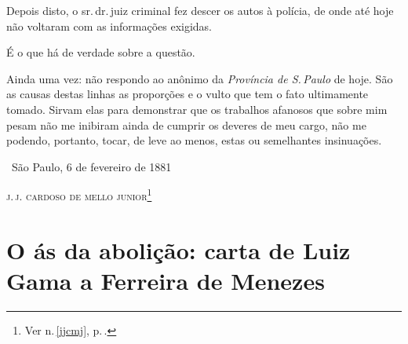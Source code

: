 Depois disto, o sr.\,dr.\,juiz criminal fez descer os autos à polícia, de
onde até hoje não voltaram com as informações exigidas.

É o que há de verdade sobre a questão.

Ainda uma vez: não respondo ao anônimo da \emph{Província de S.\,Paulo}
de hoje. São as causas destas linhas as proporções e o vulto
que tem o fato ultimamente tomado. Sirvam elas para demonstrar que os
trabalhos afanosos que sobre mim pesam não me inibiram ainda de cumprir
os deveres de meu cargo, não me podendo, portanto, tocar, de leve ao
menos, estas ou semelhantes insinuações.

\medskip
\hfill\ São Paulo, 6 de fevereiro de 1881

\hfill\textsc{j.\,j. cardoso de mello junior}\footnote{Ver n.\,\ref{jjcmj}, p.\,\pageref{jjcmj}.}

\part[O ás da abolição]{O ás da abolição: carta de Luiz Gama a Ferreira de Menezes}



